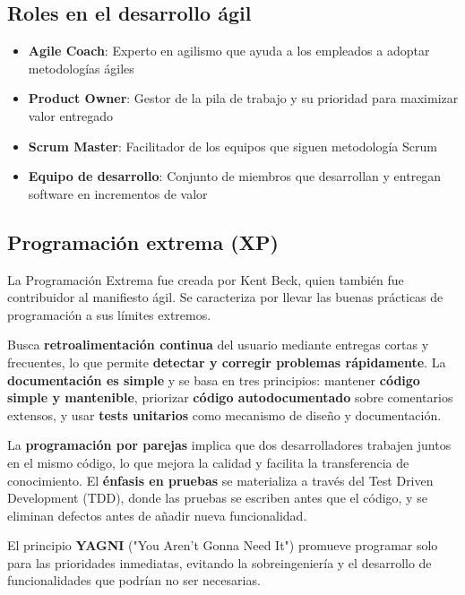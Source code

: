 \documentclass[a4paper,11pt]{report}
\begin{document}
    \subsection{Roles en el desarrollo ágil}\label{subsec:roles-en-el-desarrollo-agil}

    \begin{itemize}
        \item \textbf{Agile Coach}: Experto en agilismo que ayuda a los empleados a adoptar metodologías ágiles
        \item \textbf{Product Owner}: Gestor de la pila de trabajo y su prioridad para maximizar valor entregado
        \item \textbf{Scrum Master}: Facilitador de los equipos que siguen metodología Scrum
        \item \textbf{Equipo de desarrollo}: Conjunto de miembros que desarrollan y entregan software en incrementos de valor
    \end{itemize}


    \subsection{Programación extrema (XP)}\label{subsec:programacion-extrema-(xp)}

    La Programación Extrema fue creada por Kent Beck, quien también fue contribuidor al manifiesto ágil.
    Se caracteriza por llevar las buenas prácticas de programación a sus límites extremos.

    Busca \textbf{retroalimentación continua} del usuario mediante entregas cortas y frecuentes, lo que permite \textbf{detectar y corregir problemas rápidamente}.
    La \textbf{documentación es simple} y se basa en tres principios: mantener \textbf{código simple y mantenible}, priorizar \textbf{código autodocumentado} sobre comentarios extensos, y usar\textbf{ tests unitarios }como mecanismo de diseño y documentación.

    La \textbf{programación por parejas} implica que dos desarrolladores trabajen juntos en el mismo código, lo que mejora la calidad y facilita la transferencia de conocimiento.
    El \textbf{énfasis en pruebas} se materializa a través del Test Driven Development (TDD), donde las pruebas se escriben antes que el código, y se eliminan defectos antes de añadir nueva funcionalidad.

    El principio \textbf{YAGNI} ("You Aren't Gonna Need It") promueve programar solo para las prioridades inmediatas, evitando la sobreingeniería y el desarrollo de funcionalidades que podrían no ser necesarias.
\end{document}
